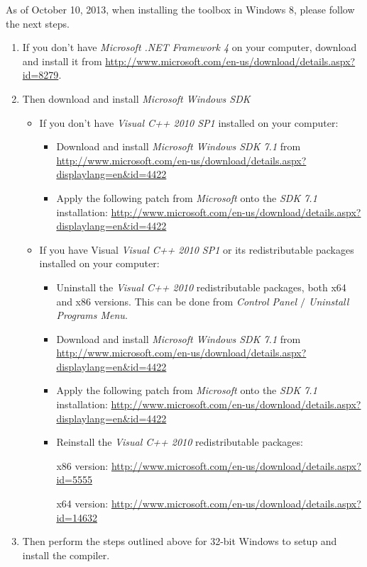 \documentclass{article}
\begin{document}
As of October 10, 2013, when installing the toolbox in Windows 8, please follow the next steps.
\begin{enumerate}
\item If you don't have {\em Microsoft .NET Framework 4} on your computer, download and install it from
\url{http://www.microsoft.com/en-us/download/details.aspx?id=8279}.
\item Then download and install {\em Microsoft Windows SDK}
	\begin{itemize}
	\item If you don't have {\em Visual C++ 2010 SP1} installed on your computer:
		\begin{itemize} 
		\item Download and install {\em Microsoft Windows SDK 7.1} from
		\url{http://www.microsoft.com/en-us/download/details.aspx?displaylang=en&id=4422}
		\item Apply the following patch from {\em Microsoft} onto the {\em SDK 7.1} installation: \url{http://www.microsoft.com/en-us/download/details.aspx?displaylang=en&id=4422}
		\end{itemize}
	\item If you have Visual {\em Visual C++ 2010 SP1} or its redistributable packages installed on your computer:
		\begin{itemize}
		\item Uninstall the {\em Visual C++ 2010} redistributable packages, both x64 and x86 versions. This can be done from {\em Control Panel $/$ Uninstall Programs Menu}.
		\item Download and install {\em Microsoft Windows SDK 7.1} from
		\url{http://www.microsoft.com/en-us/download/details.aspx?displaylang=en&id=4422}
		\item Apply the following patch from {\em Microsoft} onto the {\em SDK 7.1} installation: \url{http://www.microsoft.com/en-us/download/details.aspx?displaylang=en&id=4422}	
		\item Reinstall the {\em Visual C++ 2010} redistributable packages:	
		
		x86 version:
		\url{http://www.microsoft.com/en-us/download/details.aspx?id=5555}
		
		x64 version:
		\url{http://www.microsoft.com/en-us/download/details.aspx?id=14632}
		\end{itemize}
	\end{itemize}
\item Then perform the steps outlined above for 32-bit Windows to setup and install the compiler.
\end{enumerate}
\end{document}
